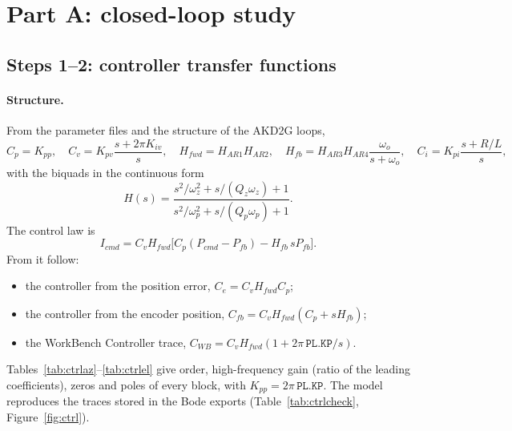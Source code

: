 \documentclass[10pt,a4paper]{article}
\numberwithin{equation}{section}
\begin{document}
\section{Part A: closed-loop study}\label{sec:A}
\subsection{Steps 1--2: controller transfer functions}
\paragraph{Structure.} From the parameter files and the structure of the AKD2G loops,
\begin{equation}
C_p=K_{pp},\quad C_v=K_{pv}\frac{s+2\pi K_{iv}}{s},\quad H_{fwd}=H_{AR1}H_{AR2},\quad H_{fb}=H_{AR3}H_{AR4}\frac{\omega_o}{s+\omega_o},\quad C_i=K_{pi}\frac{s+R/L}{s},
\end{equation}
with the biquads in the continuous form
\begin{equation}
H(s)=\frac{s^2/\omega_z^2+s/(Q_z\omega_z)+1}{s^2/\omega_p^2+s/(Q_p\omega_p)+1}.
\end{equation}
The control law is
\begin{equation}
I_{cmd}=C_vH_{fwd}\bigl[C_p(P_{cmd}-P_{fb})-H_{fb}\,sP_{fb}\bigr].
\end{equation}
From it follow:
\begin{itemize}
\item the controller from the position error, $C_e=C_vH_{fwd}C_p$;
\item the controller from the encoder position, $C_{fb}=C_vH_{fwd}(C_p+sH_{fb})$;
\item the WorkBench Controller trace, $C_{WB}=C_vH_{fwd}(1+2\pi\,\texttt{PL.KP}/s)$.
\end{itemize}
Tables~\ref{tab:ctrlaz}--\ref{tab:ctrlel} give order, high-frequency gain (ratio of the leading coefficients), zeros and poles of every block, with $K_{pp}=2\pi\,\texttt{PL.KP}$. The model reproduces the traces stored in the Bode exports (Table~\ref{tab:ctrlcheck}, Figure~\ref{fig:ctrl}).
\end{document}
